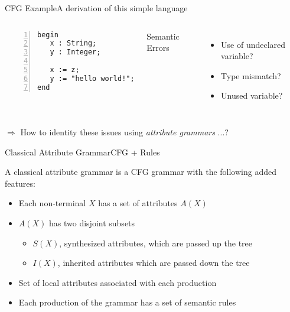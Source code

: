 

\begin{frame}[fragile=singleslide]{CFG Example}{A derivation of this simple language}

    \begin{columns}
\begin{Verbatim}[fontsize=\scriptsize,numbers=left,xleftmargin=5mm]
begin
   x : String;
   y : Integer;
	
   x := z;
   y := "hello world!";
end
\end{Verbatim}

\alert{Semantic Errors}
\begin{itemize}
    \item Use of undeclared variable?
    \item Type mismatch?
    \item Unused variable?
\end{itemize}
    \end{columns}

\newlinevspace

$\Rightarrow$ How to \alert{identity} these issues \alert{using} \emph{attribute grammars} ...?
\end{frame}




\begin{frame}{Classical Attribute Grammar}{CFG + Rules}


A classical attribute grammar is a \alert{CFG grammar} with the following added features:

\begin{itemize}
    \item Each non-terminal $X$ has a set of attributes $A(X)$
    \item $A(X)$ has two disjoint subsets
    \begin{itemize}
        \item $S(X)$, synthesized attributes, which are passed up the tree
        \item $I(X)$, inherited attributes which are passed down the tree
    \end{itemize}
    \item Set of local attributes associated with each production
    \item Each production of the grammar has a set of semantic rules
\end{itemize}

\end{frame}

